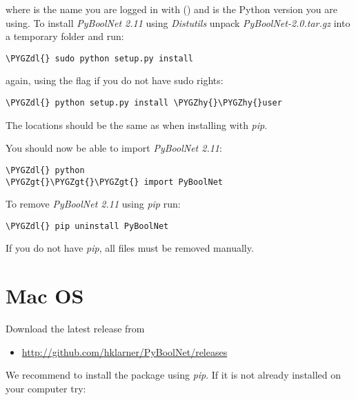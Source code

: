 \documentclass[letterpaper,10pt,english]{sphinxmanual}
\def\PYGZgt{\char`\>}
\def\PYGZdl{\char`\$}
\def\PYGZhy{\char`\-}
\begin{document}
where  is the name you are logged in with () and  is the Python version you are using.
To install \emph{PyBoolNet 2.11} using \emph{Distutils} unpack \emph{PyBoolNet-2.0.tar.gz} into a temporary folder and run:

\begin{Verbatim}[commandchars=\\\{\}]
\PYGZdl{} sudo python setup.py install
\end{Verbatim}

again, using the  flag if you do not have sudo rights:

\begin{Verbatim}[commandchars=\\\{\}]
\PYGZdl{} python setup.py install \PYGZhy{}\PYGZhy{}user
\end{Verbatim}

The locations should be the same as when installing with \emph{pip}.

You should now be able to import \emph{PyBoolNet 2.11}:

\begin{Verbatim}[commandchars=\\\{\}]
\PYGZdl{} python
\PYGZgt{}\PYGZgt{}\PYGZgt{} import PyBoolNet
\end{Verbatim}

To remove \emph{PyBoolNet 2.11} using \emph{pip} run:

\begin{Verbatim}[commandchars=\\\{\}]
\PYGZdl{} pip uninstall PyBoolNet
\end{Verbatim}

If you do not have \emph{pip}, all files must be removed manually.


\section{Mac OS}
\label{Installation:mac-os}
Download the latest release from
\begin{itemize}
\item {} 
\href{http://github.com/hklarner/PyBoolNet/releases}{http://github.com/hklarner/PyBoolNet/releases}

\end{itemize}

We recommend to install the package using \emph{pip}. If it is not already installed on your computer try:
\end{document}
